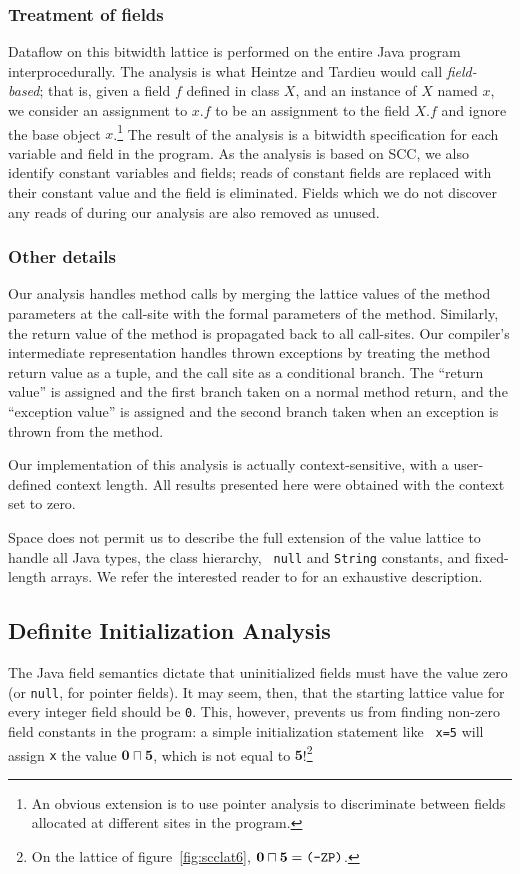 \documentclass{acmconf}
\newcommand{\meet}{\ensuremath{\sqcap}}
\begin{document}
\subsubsection{Treatment of fields}
Dataflow on this bitwidth lattice is performed on the entire Java
program interprocedurally.  The analysis is what Heintze and Tardieu
\cite{heintze01}
would call {\it field-based}; that is, given a field $f$ defined in
class $X$, and an instance of $X$ named $x$, we consider an assignment
to $x.f$ to be an assignment to the field $X.f$ and ignore the base
object $x$.\footnote{An obvious extension is to use pointer
analysis to discriminate between fields allocated at different sites
in the program.}  The result of the analysis is a bitwidth
specification for each variable and field in the program.  As the
analysis is based on SCC, we also identify constant variables and
fields; reads of constant fields are replaced with their constant
value and the field is eliminated.  Fields which we do not discover
any reads of during our analysis are also removed as unused.

\subsubsection{Other details}
Our analysis handles method calls by merging the lattice values of the
method parameters at the call-site with the formal parameters of the
method.  Similarly, the return value of the method is propagated back
to all call-sites.  Our compiler's intermediate representation handles
thrown exceptions by treating the method return value as a tuple, and
the call site as a conditional branch.  The ``return value'' is
assigned and the first branch taken on a normal method return, and the
``exception value'' is assigned and the second branch taken when an
exception is thrown from the method.

Our implementation of this analysis is actually context-sensitive,
with a user-defined context length.  All results presented here were
obtained with the context set to zero.

Space does not permit us to describe the full extension of the value
lattice to handle all Java types, the class hierarchy, {\tt
  null} and {\tt String} constants, and fixed-length arrays.
We refer the interested reader to \cite{ananian99:tech} for an
exhaustive description.

\subsection{Definite Initialization Analysis}
The Java field semantics dictate that uninitialized fields must have
the value zero (or {\tt null}, for pointer fields).  It may seem,
then, that the starting lattice value for every integer field should
be {\tt 0}.  This, however, prevents us from finding non-zero field
constants in the program: a simple initialization statement like {\tt
  x=5} will assign {\tt x} the value $\mathbf{0}\meet\mathbf{5}$,
which is not equal to $\mathbf{5}$!\footnote{On the lattice of
  figure~\ref{fig:scclat6}, $\mathbf{0}\meet\mathbf{5}=\text{\tt
    (-ZP)}$.}
\end{document}
